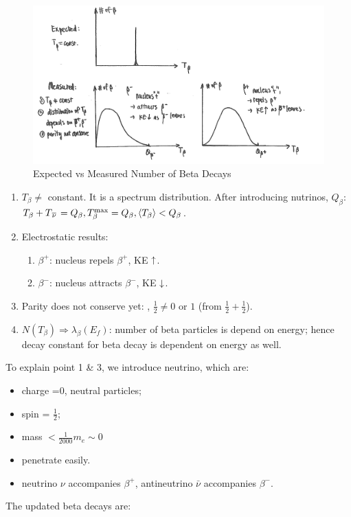\documentclass{school-22.101-notes}
\begin{document}
\begin{figure}
    \centering
    \includegraphics[width=6in]{images/rd/beta-vs-T.png}
    \caption{Expected vs Measured Number of Beta Decays\label{beta-vs-T}}
\end{figure}
\begin{enumerate}
\item $T_{\beta} \neq$ constant. It is a spectrum distribution. After introducing nutrinos, $Q_{\beta}$: $T_{\beta} + T_{\left.\overline{\nu} \right.} = Q_{\beta}, T_{\beta}^{\mathrm{max}} = Q_{\beta}, \left< T_{\beta} \right> < Q_{\beta}$. 
\item Electrostatic results: 
    \begin{enumerate}
    \item $\beta^+$: nucleus repels $\beta^+$, KE $\uparrow$.
    \item $\beta^-$: nucleus attracts $\beta^-$, KE $\downarrow$. 
    \end{enumerate}
\item Parity does not conserve yet: , $\frac{1}{2} \neq 0 \mbox{ or } 1$ (from $ \frac{1}{2} + \frac{1}{2}$).
\item $N(T_{\beta}) \Rightarrow \lambda_{\beta} (E_f)$: number of beta particles is depend on energy; hence decay constant for beta decay is dependent on energy as well.
\end{enumerate}
To explain point 1 \& 3, we introduce neutrino, which are:
\begin{itemize}
\item charge  =0, neutral particles;
\item spin = $\frac{1}{2}$;
\item mass $< \frac{1}{2000} m_e \sim 0 $
\item penetrate easily.  
\item neutrino $\nu$ accompanies $\beta^+$, antineutrino $\bar{\nu}$ accompanies $\beta^-$.
\end{itemize}
The updated beta decays are: 
\end{document}
